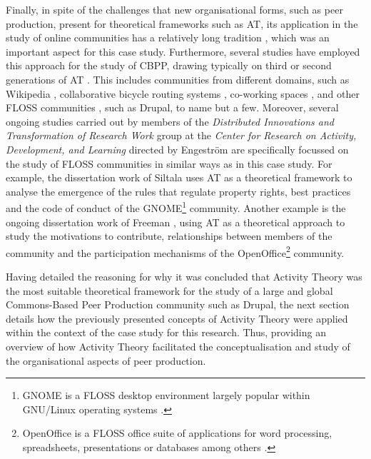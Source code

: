 Finally, in spite of the challenges that new organisational forms, such as peer production, present for theoretical frameworks such as AT, its application in the study of online communities has a relatively long tradition \parencite[e.g.][]{barab2004using, nardi2010my, sam2012activity, dennen2014becoming}, which was an important aspect for this case study. Furthermore, several studies have employed this approach for the study of CBPP, drawing typically on third or second generations of AT \parencite[13-26]{yamagata2010understanding}. This includes communities from different domains, such as Wikipedia \parencite{bryant2005becoming}, collaborative bicycle routing systems \parencite{panciera2014cream}, co-working spaces \parencite{spinuzzi2012working}, and other FLOSS communities \parencite{hemetsberger2009collective}, such as Drupal, to name but a few. Moreover, several ongoing studies carried out by members of the \textit{Distributed Innovations and Transformation of Research Work} group at the \textit{Center for Research on Activity, Development, and Learning} directed by Engestr{\"o}m \parencite{cradle-inno:2014:Online} are specifically focussed on the study of FLOSS communities in similar ways as in this case study. For example, the dissertation work of Siltala \parencite{cradle-siltala:2014:Online} uses AT as a theoretical framework to analyse the emergence of the rules that regulate property rights, best practices and the code of conduct of the GNOME\footnote{GNOME is a FLOSS desktop environment largely popular within GNU/Linux operating systems \parencite{gnome:Online}.} community. Another example is the ongoing dissertation work of Freeman \parencite{cradle-freeman:2014:Online}, using AT as a theoretical approach to study the motivations to contribute, relationships between members of the community and the participation mechanisms of the OpenOffice\footnote{OpenOffice is a FLOSS office suite of applications  for word processing, spreadsheets, presentations or databases among others \parencite{oo:Online}.} community.

Having detailed the reasoning for why it was concluded that Activity Theory was the most suitable theoretical framework for the study of a large and global Commons-Based Peer Production community such as Drupal, the next section details how the previously presented concepts of Activity Theory were applied within the context of the case study for this research. Thus, providing an overview of how Activity Theory facilitated the conceptualisation and study of the organisational aspects of peer production.


